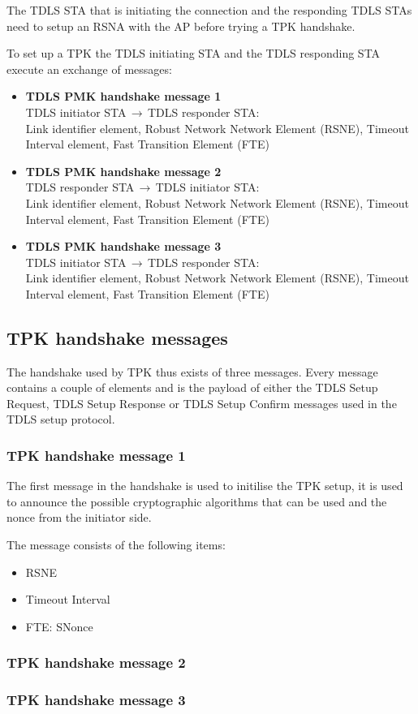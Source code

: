 The TDLS STA that is initiating the connection and the responding TDLS STAs need to setup an RSNA with the AP before trying a TPK handshake. 

To set up a TPK the TDLS initiating STA and the TDLS responding STA execute an exchange of messages:

\begin{itemize}
	\item[] \textbf{TDLS PMK handshake message 1}\\ TDLS initiator STA$\,\to\,$TDLS responder STA:\\
	Link identifier element, Robust Network Network Element (RSNE), Timeout Interval element, Fast Transition Element (FTE)
	\item[] \textbf{TDLS PMK handshake message 2}\\ TDLS responder STA$\,\to\,$TDLS initiator STA:\\
	Link identifier element, Robust Network Network Element (RSNE), Timeout Interval element, Fast Transition Element (FTE)
	\item[] \textbf{TDLS PMK handshake message 3}\\ TDLS initiator STA$\,\to\,$TDLS responder STA:\\
	Link identifier element, Robust Network Network Element (RSNE), Timeout Interval element, Fast Transition Element (FTE)
\end{itemize}

\subsection{TPK handshake messages}

The handshake used by TPK thus exists of three messages. Every message contains a couple of elements and is the payload of either the TDLS Setup Request, TDLS Setup Response or TDLS Setup Confirm messages used in the TDLS setup protocol.

\subsubsection{TPK handshake message 1}

The first message in the handshake is used to initilise the TPK setup, it is used to announce the possible cryptographic algorithms that can be used and the nonce from the initiator side.

The message consists of the following items:

\begin{itemize}
	\item RSNE
	\item Timeout Interval
	\item FTE: SNonce
\end{itemize} 

\subsubsection{TPK handshake message 2}

\subsubsection{TPK handshake message 3}